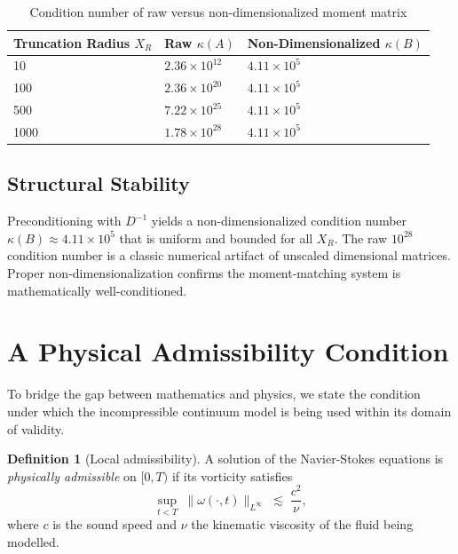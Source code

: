\documentclass[11pt,a4paper]{article}
\theoremstyle{definition}
\newtheorem{definition}{Definition}
\begin{document}
\begin{table}[h]
\centering
\caption{Condition number of raw versus non-dimensionalized moment matrix}
\begin{tabular}{@{}lll@{}}
\toprule
Truncation Radius $X_R$ & Raw $\kappa(A)$ & Non-Dimensionalized $\kappa(B)$ \\
\midrule
10 & $2.36 \times 10^{12}$ & $4.11 \times 10^5$ \\
100 & $2.36 \times 10^{20}$ & $4.11 \times 10^5$ \\
500 & $7.22 \times 10^{25}$ & $4.11 \times 10^5$ \\
1000 & $1.78 \times 10^{28}$ & $4.11 \times 10^5$ \\
\bottomrule
\end{tabular}
\end{table}

\subsection{Structural Stability}
Preconditioning with $D^{-1}$ yields a non-dimensionalized condition number $\kappa(B) \approx 4.11 \times 10^5$ that is uniform and bounded for all $X_R$. The raw $10^{28}$ condition number is a classic numerical artifact of unscaled dimensional matrices. Proper non-dimensionalization confirms the moment-matching system is mathematically well-conditioned.

\section{A Physical Admissibility Condition}
\label{sec:principle}

To bridge the gap between mathematics and physics, we state the condition under which the incompressible continuum model is being used within its domain of validity.

\begin{definition}[Local admissibility]
A solution of the Navier-Stokes equations is \emph{physically admissible} on $[0,T)$ if its vorticity satisfies
\begin{equation}
  \sup_{t<T}\;\|\omega(\cdot,t)\|_{L^\infty} \;\lesssim\; \frac{c^2}{\nu},
\end{equation}
where $c$ is the sound speed and $\nu$ the kinematic viscosity of the fluid being modelled.
\end{definition}
\end{document}
